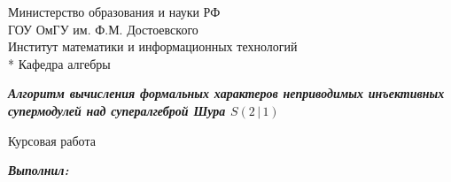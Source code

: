\begin{titlepage}
	\newpage

	\begin{center}
    	\Large{Министерство образования и науки РФ \\
		       ГОУ ОмГУ им. Ф.М. Достоевского \\}
	    \large{Институт математики и информационных технологий \\*
		       Кафедра алгебры}
	\end{center}

	\vfill\vfill\vfill\vfill

	\begin{center}
		\LARGE\textbf{\textit{Алгоритм вычисления формальных характеров 
		                      неприводимых инъективных супермодулей 
		                      над супералгеброй Шура $ S(2\,|\,1) $ }}
	\end{center}

	\vfill

	\begin{center}
		\Large{Курсовая работа}
	\end{center}
	
	\vfill\vfill\vfill\vfill
	
	\begin{singlespace}
    \large {
        {}\hspace{8.4cm}\textbf{\textit{Выполнил:}}

        {}\hspace{8.4cm}{студент группы МПС-703-О}

        {}\hspace{8.4cm}{специальности <<Прикладная}

        {}\hspace{8.4cm}{математика и информатика>>}

        {} 
        
        \vspace{2mm}

        {}\hspace{8.4cm}{\underline{{}\hspace{5cm}{}}} \vspace{-0.7mm}

        {}

        \vspace{10mm}

}
\end{singlespace}
\end{titlepage}
